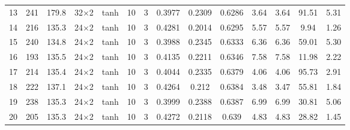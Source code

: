 \begin{tabular}{lcc cccc ccccccc}
  13 & 241 & 179.8 & 32$\times$2 & tanh & 10 & 3 & \num{0.3977} & \num{0.2309} & \num{0.6286} & 3.64 & 3.64 & 91.51 & 5.31 \\
  14 & 216 & 135.3 & 24$\times$2 & tanh & 10 & 3 & \num{0.4281} & \num{0.2014} & \num{0.6295} & 5.57 & 5.57 & 9.94 & 1.26 \\
  15 & 240 & 134.8 & 24$\times$2 & tanh & 10 & 3 & \num{0.3988} & \num{0.2345} & \num{0.6333} & 6.36 & 6.36 & 59.01 & 5.30 \\
  16 & 193 & 135.5 & 24$\times$2 & tanh & 10 & 3 & \num{0.4135} & \num{0.2211} & \num{0.6346} & 7.58 & 7.58 & 11.98 & 2.22 \\
  17 & 214 & 135.4 & 24$\times$2 & tanh & 10 & 3 & \num{0.4044} & \num{0.2335} & \num{0.6379} & 4.06 & 4.06 & 95.73 & 2.91 \\
  18 & 222 & 137.1 & 24$\times$2 & tanh & 10 & 3 & \num{0.4264} & \num{0.212} & \num{0.6384} & 3.48 & 3.47 & 55.81 & 1.84 \\
  19 & 238 & 135.3 & 24$\times$2 & tanh & 10 & 3 & \num{0.3999} & \num{0.2388} & \num{0.6387} & 6.99 & 6.99 & 30.81 & 5.06 \\
  20 & 205 & 135.3 & 24$\times$2 & tanh & 10 & 3 & \num{0.4272} & \num{0.2118} & \num{0.639} & 4.83 & 4.83 & 28.82 & 1.45 \\
\bottomrule
\end{tabular}
